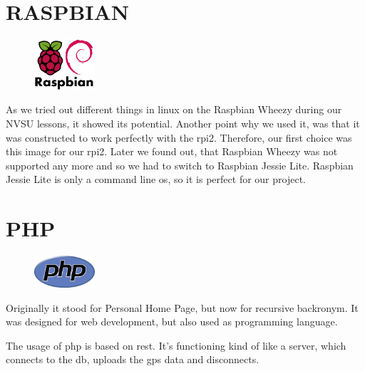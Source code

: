 \section{RASPBIAN}
\begin{figure}
  \begin{center}
    \includegraphics[width=0.2\textwidth] {bilder/raspbian}
  \end{center}
\end{figure}
As we tried out different things in linux on the Raspbian Wheezy during our NVSU lessons, it showed its potential. Another point why we used it, was that it was constructed to work perfectly with the \gls{rpi2}. Therefore, our first choice was this image for our \gls{rpi2}. Later we found out, that Raspbian Wheezy was not supported any more and so we had to switch to Raspbian Jessie Lite. Raspbian Jessie Lite is only a command line \gls{os}, so it is perfect for our project.

\section{PHP}
\begin{figure}
  \begin{center}
    \includegraphics[width=0.2\textwidth] {bilder/php}
  \end{center}
\end{figure}
Originally it stood for Personal Home Page, but now for recursive backronym. It was designed for web development, but also used as programming language. 

The usage of \gls{php} is based on \gls{rest}. It's functioning kind of like a server, which connects to the \gls{db}, uploads the \gls{gps} data and disconnects.

